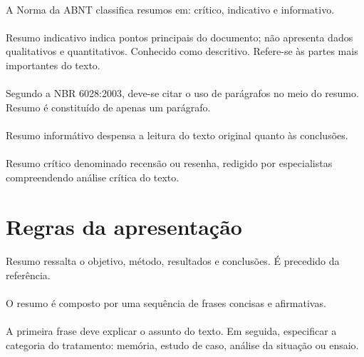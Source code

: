 \paragraph{}
A Norma da ABNT classifica resumos em: crítico, indicativo e informativo.

\paragraph{}
Resumo indicativo indica pontos principais do documento; não apresenta dados qualitativos e quantitativos. Conhecido como descritivo. Refere-se às partes mais importantes do texto.

\paragraph{}
Segundo a NBR 6028:2003, deve-se citar o uso de parágrafos no meio do resumo. Resumo é constituído de apenas um parágrafo.

\paragraph{}
Resumo informátivo despensa a leitura do texto original quanto às conclusões.

\paragraph{}
Resumo crítico denominado recensão ou resenha, redigido por especialistas compreendendo análise crítica do texto.

\section{Regras da apresentação}

\paragraph{}
Resumo ressalta o objetivo, método, resultados e conclusões. É precedido da referência.

\paragraph{}
O resumo é composto por uma sequência de frases concisas e afirmativas.

\paragraph{}
A primeira frase deve explicar o assunto do texto. Em seguida, especificar a categoria do tratamento: memória, estudo de caso, análise da situação ou ensaio.

